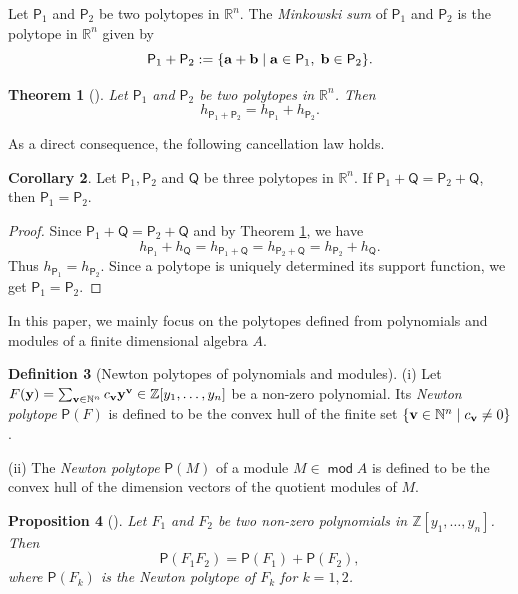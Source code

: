 \documentclass[10pt]{amsart}
\newtheorem{theorem}{Theorem}[section]
\newtheorem{proposition}[theorem]{Proposition}
\theoremstyle{definition}
\newtheorem{definition}[theorem]{Definition}
\newtheorem{corollary}[theorem]{Corollary}
\theoremstyle{remark}
\numberwithin{equation}{section}
\def\mod{\opname{mod}\nolimits}
\newcommand{\opname}[1]{\operatorname{\mathsf{#1}}}
\begin{document}
Let $\mathsf P_1$ and $\mathsf P_2$ be two polytopes in $\mathbb R^n$. The {\em Minkowski sum} of $\mathsf P_1$ and $\mathsf P_2$ is the polytope in $\mathbb R^n$ given by
\[\mathsf P_1+\mathsf P_2:=\{ {\bf a}+{\bf b}\mid {\bf a}\in \mathsf P_1,\;{\bf b}\in\mathsf P_2\}.\]

\begin{theorem}[{\cite[Theorem 1.7.5]{Schneider_2013}}] \label{thm:h-additive}
Let $\mathsf P_1$ and $\mathsf P_2$ be two polytopes in $\mathbb R^n$. Then \[h_{\mathsf P_1+\mathsf P_2}=h_{\mathsf P_1}+h_{\mathsf P_2}.\]
\end{theorem}
As a direct consequence, the following cancellation law holds.
\begin{corollary}\label{cor:cancel-law}
    Let $\mathsf P_1, \mathsf P_2$ and $\mathsf Q$ be three polytopes in $\mathbb R^n$. If $\mathsf P_1+\mathsf Q=\mathsf P_2+\mathsf Q$, then $\mathsf P_1=\mathsf P_2$.
\end{corollary}
\begin{proof}
 Since $\mathsf P_1+\mathsf Q=\mathsf P_2+\mathsf Q$ and by Theorem \ref{thm:h-additive}, we have
 \[ h_{\mathsf P_1}+h_{\mathsf Q}=h_{\mathsf P_1+\mathsf Q}=h_{\mathsf P_2+\mathsf Q}=h_{\mathsf P_2}+h_{\mathsf Q}.
 \]
 Thus $h_{\mathsf P_1}=h_{\mathsf P_2}$. Since a polytope is uniquely determined its support function, we get $\mathsf P_1=\mathsf P_2$.
\end{proof}


In this paper, we mainly focus on the polytopes defined from polynomials and modules of a finite dimensional algebra $A$.

\begin{definition}[Newton polytopes of polynomials and modules] \label{def:polytope}
(i) Let $F({\bf y})=\sum_{{\bf v}\in\mathbb N^n}c_{\bf v}{\bf y}^{\bf v}\in\mathbb Z[y_1,\ldots,y_n]$ be a non-zero polynomial. Its {\em Newton polytope} $\mathsf P(F)$ is defined to be the convex hull of the finite set $\{{\bf v}\in\mathbb N^n\mid c_{\bf v}\neq 0\}$.

(ii) The {\em Newton polytope} $\mathsf P(M)$ of a module $M\in\mod A$ is defined to be the convex hull of the dimension vectors of the quotient modules of $M$.
\end{definition}

\begin{proposition}[{\cite[Chapter 6, Prop. 1.2]{GKZ-1994}}]
\label{pro:GKZ}
 Let $F_1$ and $F_2$ be two non-zero polynomials in $\mathbb Z[y_1,\ldots,y_n]$. Then 
 $$\mathsf P(F_1F_2)=\mathsf P(F_1)+\mathsf P(F_2),$$
 where $\mathsf P(F_k)$ is the Newton polytope of $F_k$ for $k=1,2$.
\end{proposition}
\end{document}
